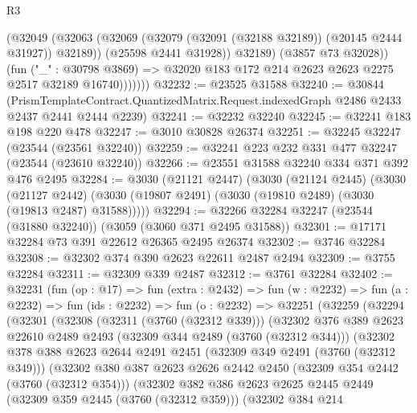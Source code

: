 \begin{lexlean}{R3}
\begin{coremodule}
                    (@32049
                      (@32063
                        (@32069 (@32079 (@32091 (@32188 @32189)) (@20145 @2444 @31927)) @32189))
                      (@25598 @2441 @31928))
                    @32189)
                  (@3857 @73 @32028))
                (fun ("_" : @30798 @3869) =>
                @32020 @183 @172 @214 @2623 @2623 @2275 @2517 @32189 @16740)))))))
@32232 := @23525 @31588
@32240 := @30844
    (PrismTemplateContract.QuantizedMatrix.Request.indexedGraph @2486 @2433 @2437 @2441 @2444 @2239)
@32241 := @32232 @32240
@32245 := @32241 @183 @198 @220 @478
@32247 := @3010 @30828 @26374
@32251 := @32245 @32247 (@23544 (@23561 @32240))
@32259 := @32241 @223 @232 @331 @477 @32247 (@23544 (@23610 @32240))
@32266 := @23551 @31588 @32240 @334 @371 @392 @476 @2495
@32284 := @3030
    (@21121 @2447)
    (@3030
      (@21124 @2445)
      (@3030
        (@21127 @2442)
        (@3030 (@19807 @2491) (@3030 (@19810 @2489) (@3030 (@19813 @2487) @31588)))))
@32294 := @32266 @32284 @32247 (@23544 (@31880 @32240)) (@3059 (@3060 @371 @2495 @31588))
@32301 := @17171 @32284 @73 @391 @22612 @26365 @2495 @26374
@32302 := @3746 @32284
@32308 := @32302 @374 @390 @2623 @22611 @2487 @2494
@32309 := @3755 @32284
@32311 := @32309 @339 @2487
@32312 := @3761 @32284
@32402 := @32231
    (fun (op : @17) =>
    fun (extra : @2432) =>
    fun (w : @2232) =>
    fun (a : @2232) =>
    fun (ids : @2232) =>
    fun (o : @2232) =>
    @32251
      (@32259
        (@32294
          (@32301
            (@32308
              (@32311 (@3760 (@32312 @339)))
              (@32302
                @376
                @389
                @2623
                @22610
                @2489
                @2493
                (@32309 @344 @2489 (@3760 (@32312 @344)))
                (@32302
                  @378
                  @388
                  @2623
                  @2644
                  @2491
                  @2451
                  (@32309 @349 @2491 (@3760 (@32312 @349)))
                  (@32302
                    @380
                    @387
                    @2623
                    @2626
                    @2442
                    @2450
                    (@32309 @354 @2442 (@3760 (@32312 @354)))
                    (@32302
                      @382
                      @386
                      @2623
                      @2625
                      @2445
                      @2449
                      (@32309 @359 @2445 (@3760 (@32312 @359)))
                      (@32302
                        @384
                        @214

\end{coremodule}
\end{lexlean}
